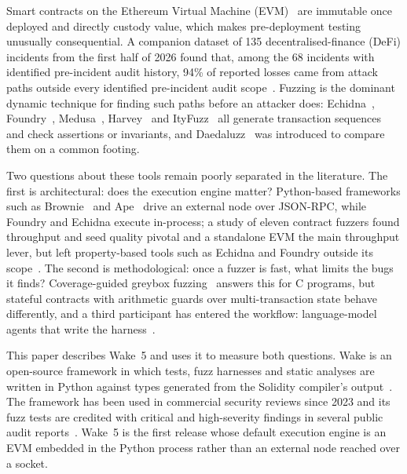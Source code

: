 \documentclass[11pt,a4paper]{article}
\newcommand{\wake}{Wake}
\begin{document}
Smart contracts on the Ethereum Virtual Machine (EVM)~\cite{wood2014ethereum} are immutable once deployed and directly custody value, which makes pre-deployment testing unusually consequential. A companion dataset of 135 decentralised-finance (DeFi) incidents from the first half of 2026 found that, among the 68 incidents with identified pre-incident audit history, 94\% of reported losses came from attack paths outside every identified pre-incident audit scope~\cite{gattermayer2026incidents}. Fuzzing is the dominant dynamic technique for finding such paths before an attacker does: Echidna~\cite{grieco2020echidna}, Foundry~\cite{foundry}, Medusa~\cite{medusa}, Harvey~\cite{wustholz2020harvey} and ItyFuzz~\cite{shou2023ityfuzz} all generate transaction sequences and check assertions or invariants, and Daedaluzz~\cite{daedaluzz2023,wustholz2023benchmarking} was introduced to compare them on a common footing.

Two questions about these tools remain poorly separated in the literature. The first is architectural: does the execution engine matter? Python-based frameworks such as Brownie~\cite{brownie} and Ape~\cite{ape} drive an external node over JSON-RPC, while Foundry and Echidna execute in-process; a study of eleven contract fuzzers found throughput and seed quality pivotal and a standalone EVM the main throughput lever, but left property-based tools such as Echidna and Foundry outside its scope~\cite{wu2024arewethereyet}. The second is methodological: once a fuzzer is fast, what limits the bugs it finds? Coverage-guided greybox fuzzing~\cite{bohme2016aflfast} answers this for C programs, but stateful contracts with arithmetic guards over multi-transaction state behave differently, and a third participant has entered the workflow: language-model agents that write the harness~\cite{zhang2024fuzzdriver,xia2024fuzz4all}.

This paper describes \wake{}~5 and uses it to measure both questions. \wake{} is an open-source framework in which tests, fuzz harnesses and static analyses are written in Python against types generated from the Solidity compiler's output~\cite{wake2026repo}. The framework has been used in commercial security reviews since 2023 and its fuzz tests are credited with critical and high-severity findings in several public audit reports~\cite{ipor2023audit,pwn2023audit,lido2025csm}. \wake{}~5 is the first release whose default execution engine is an EVM embedded in the Python process rather than an external node reached over a socket.
\end{document}
